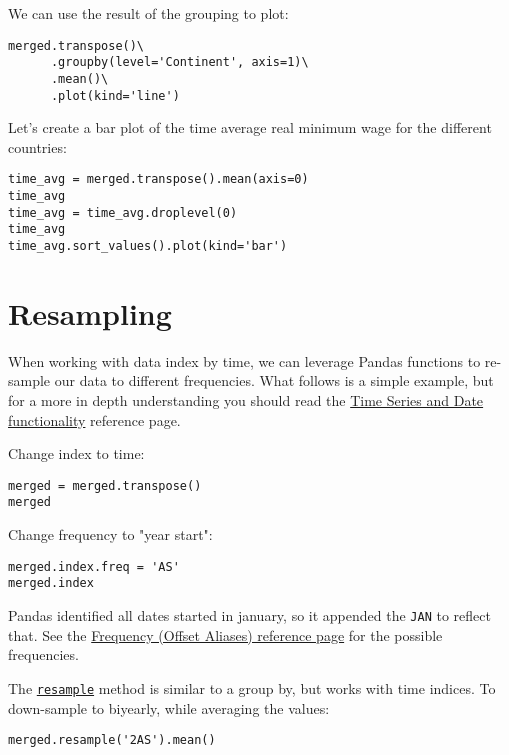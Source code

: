 \documentclass[12pt, a4paper]{article}
\begin{document}
We can use the result of the grouping to plot:
\lstset{language=jupyter-python,label= ,caption= ,captionpos=b,numbers=none}
\begin{lstlisting}
merged.transpose()\
      .groupby(level='Continent', axis=1)\
      .mean()\
      .plot(kind='line')
\end{lstlisting}

Let's create a bar plot of the time average real minimum wage for the different countries:
\lstset{language=jupyter-python,label= ,caption= ,captionpos=b,numbers=none}
\begin{lstlisting}
time_avg = merged.transpose().mean(axis=0)
time_avg
time_avg = time_avg.droplevel(0)
time_avg
time_avg.sort_values().plot(kind='bar')
\end{lstlisting}
\section{Resampling}
\label{sec:org7bb8de0}
When working with data index by time, we can leverage Pandas functions to re-sample our data to different frequencies.
What follows is a simple example, but for a more in depth understanding you should read the \href{https://pandas.pydata.org/pandas-docs/stable/user\_guide/timeseries.html}{Time Series and Date functionality} reference page.

Change index to time:
\lstset{language=jupyter-python,label= ,caption= ,captionpos=b,numbers=none}
\begin{lstlisting}
merged = merged.transpose()
merged
\end{lstlisting}
Change frequency to "year start":
\lstset{language=jupyter-python,label= ,caption= ,captionpos=b,numbers=none}
\begin{lstlisting}
merged.index.freq = 'AS'
merged.index
\end{lstlisting}
Pandas identified all dates started in january, so it appended the \texttt{JAN} to reflect that.
See the \href{https://pandas.pydata.org/pandas-docs/stable/user\_guide/timeseries.html\#offset-aliases}{Frequency (Offset Aliases) reference page} for the possible frequencies.

The \href{https://pandas.pydata.org/pandas-docs/stable/reference/api/pandas.Series.resample.html\#pandas.Series.resample}{\texttt{resample}} method is similar to a group by, but works with time indices.
To down-sample to biyearly, while averaging the values:
\lstset{language=jupyter-python,label= ,caption= ,captionpos=b,numbers=none}
\begin{lstlisting}
merged.resample('2AS').mean()
\end{lstlisting}
\end{document}

